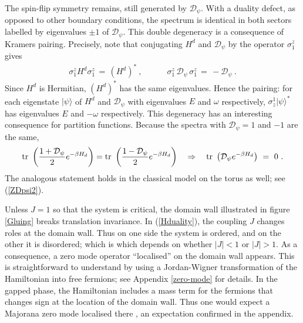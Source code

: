 \documentclass[11pt]{article}
\newcommand{\D}{{\mathcal{D}}}
\numberwithin{equation}{section}		%
\begin{document}
The spin-flip symmetry remains, still generated by ${\D}_\psi$.  With a duality defect, as opposed to other boundary conditions, the spectrum is identical in both sectors labelled by eigenvalues $\pm 1$ of $\D_\psi$. This double degeneracy is a consequence of Kramers pairing. 
Precisely, note that conjugating $H^d$ and $\D_\psi$ by the operator $\sigma^z_1$ gives 
\begin{align}
\sigma^z_1 H^d \sigma^z_1\,=\, (H^d)^*\ , \qquad\quad \sigma^z_1\, \D_\psi\,\sigma^z_1\, =\, - \D_\psi\ .
\end{align}
Since $H^d$ is Hermitian, $(H^d)^*$ has the same eigenvalues. Hence the pairing: for each eigenstate $|\psi\rangle$ of $H^d$ and $\D_\psi$ with eigenvalues $E$ and $\omega$ respectively, $\sigma_z^1|\psi\rangle^*$ has  eigenvalues $E$ and $-\omega$ respectively. This degeneracy has an interesting consequence for partition functions. Because the spectra with $\D_\psi=1$ and $-1$ are the same,
\begin{align}
\hbox{tr }\left(\frac{1+\D_\psi}{2} e^{-\beta H_d} \right) = \hbox{tr }\left(\frac{1-\D_\psi}{2} e^{-\beta H_d} \right)
\quad\Rightarrow\quad \hbox{tr }\left(\D_\psi e^{-\beta H_d} \right)\ =\ 0\ .
\label{ZDpsi}
\end{align}
The analogous statement holds in the classical model on the torus as well; see (\ref{ZDpsi2}). 

Unless $J=1$ so that the system is critical, the domain wall illustrated in figure \ref{Gluing} breaks translation invariance.  In (\ref{Hduality}), the coupling $J$ changes roles at the domain wall. Thus on one side the system is ordered, and on the other it is disordered; which is which depends on whether $|J|<1$ or $|J|>1$. As a consequence, a  zero mode operator ``localised'' on the domain wall appears. This is straightforward to understand by using a Jordan-Wigner transformation of the Hamiltonian into free fermions; see Appendix \ref{zero-mode} for details.  In the gapped phase, the Hamiltonian includes a mass term for the fermions that changes sign at the location of the domain wall. Thus one would expect a Majorana zero mode localised there \cite{Aliceareview}, an expectation confirmed in the appendix. 
\end{document}
